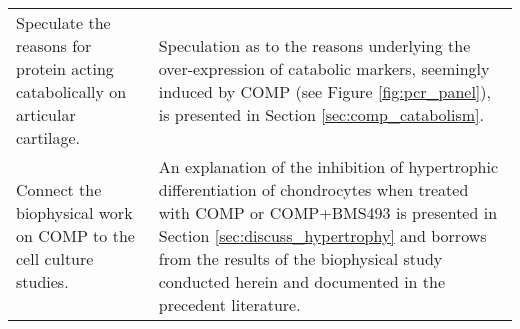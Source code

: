 \begin{landscape}
\begin{table}[h!]
\begin{tabular}{ p{} p{} }
    Speculate the reasons for protein acting catabolically on articular
    cartilage.
    &
    Speculation as to the reasons underlying the over-expression of catabolic
    markers, seemingly induced by COMP (see Figure \ref{fig:pcr_panel}), is
    presented in Section \ref{sec:comp_catabolism}.
    \\

    Connect the biophysical work on COMP to the cell culture studies.
    &
    An explanation of the inhibition of hypertrophic differentiation of
    chondrocytes when treated with COMP or COMP+BMS493 is presented in Section
    \ref{sec:discuss_hypertrophy} and borrows from the results of the
    biophysical study conducted herein and documented in the precedent
    literature.
    \\

    \hline
\end{tabular}
\end{table}
\end{landscape}
\renewcommand{\arraystretch}{1}


